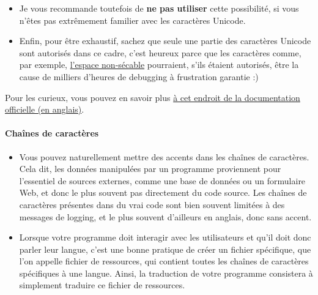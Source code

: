     \begin{itemize}
\tightlist
\item
  Je vous recommande toutefois de \textbf{ne pas utiliser} cette
  possibilité, si vous n'êtes pas extrêmement familier avec les
  caractères Unicode.
\end{itemize}

    \begin{itemize}
\tightlist
\item
  Enfin, pour être exhaustif, sachez que seule une partie des caractères
  Unicode sont autorisés dans ce cadre, c'est heureux parce que les
  caractères comme, par exemple,
  \href{http://www.fileformat.info/info/unicode/char/a0/index.htm}{l'espace
  non-sécable} pourraient, s'ils étaient autorisés, être la cause de
  milliers d'heures de debugging à frustration garantie :)
\end{itemize}

Pour les curieux, vous pouvez en savoir plus
\href{https://docs.python.org/3/reference/lexical_analysis.html\#identifiers}{à
cet endroit de la documentation officielle (en anglais)}.

    \hypertarget{chauxeenes-de-caractuxe8res}{%
\paragraph{Chaînes de caractères}\label{chauxeenes-de-caractuxe8res}}

    \begin{itemize}
\item
  Vous pouvez naturellement mettre des accents dans les chaînes de
  caractères. Cela dit, les données manipulées par un programme
  proviennent pour l'essentiel de sources externes, comme une base de
  données ou un formulaire Web, et donc le plus souvent pas directement
  du code source. Les chaînes de caractères présentes dans du vrai code
  sont bien souvent limitées à des messages de logging, et le plus
  souvent d'ailleurs en anglais, donc sans accent.
\item
  Lorsque votre programme doit interagir avec les utilisateurs et qu'il
  doit donc parler leur langue, c'est une bonne pratique de créer un
  fichier spécifique, que l'on appelle fichier de ressources, qui
  contient toutes les chaînes de caractères spécifiques à une langue.
  Ainsi, la traduction de votre programme consistera à simplement
  traduire ce fichier de ressources.
\end{itemize}

    \begin{Shaded}
\begin{Highlighting}[]
\OperatorTok{=} 
\end{Highlighting}
\end{Shaded}

